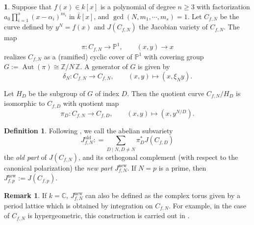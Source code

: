 \documentclass{amsart}[11pt]
\theoremstyle{definition}
\newtheorem{defn}[thm]{Definition}
\newtheorem{rem}[thm]{Remark}
\newtheorem{sect}[thm]{}
\numberwithin{equation}{section}
\theoremstyle{notitle}
\begin{document}
\begin{sect}
  

  Suppose that $f(x)\in k[x]$ is a polynomial of degree $n\geq 3$ with
  factorization $a_0\prod_{i=1}^s(x-\alpha_i)^{m_i}$ in $\bar{k}[x]$,
  and $\gcd(N, m_1, \cdots, m_s)=1$. Let $C_{f,N}$ be the curve
  defined by $y^N=f(x)$ and $J(C_{f,N})$ the Jacobian variety of
  $C_{f,N}$. The map
\begin{equation}
  \label{eq:cyclic_cover}
  \pi : C_{f,N}\to {\mathbb{P}}^1,\qquad (x,y)\to x
\end{equation}
realizes $C_{f,N}$ as a (ramified) cyclic cover of ${\mathbb{P}}^1$ with
covering group $G:=\operatorname{Aut}(\pi)\cong {\mathbb{Z}/ {N}\, \mathbb{Z}}$. A generator of
$G$ is given by
\[ \delta_N: C_{f,N}\to C_{f, N}, \qquad (x,y)\mapsto (x, \xi_N
y).\] 

Let $H_D$ be the subgroup of $G$ of index $D$. Then the quotient curve
$C_{f,N}/H_D$ is isomorphic to $C_{f, D}$ with quotient map
\begin{equation}
  \label{eq:quotient}
 \pi_D: C_{f,N}\to C_{f, D}, \qquad (x,y)\mapsto (x, y^{N/D}).  
\end{equation}
\end{sect}

\begin{defn}\label{defn:def-of-new-part}
Following \cite[Definition 5.1]{MR1708603}, we call the abelian
subvariety 
\[ J_{f,N}^{\mathrm{old}}: = \sum_{D\mid N, D\neq N} \pi_D^* J(C_{f,D}) \] the
\textit{old part} of $J(C_{f,N})$, and its orthogonal complement (with
respect to the canonical polarization) the \textit{new part}
$J_{f,N}^{\mathrm{new}}$.  If $N=p$ is a prime, then $J_{f,p}^{\mathrm{new}}:=J(C_{f,p})$. 
\end{defn}
\begin{rem}
  If $k={\mathbb{C}}$, $J_{f,N}^{\mathrm{new}}$ can also be defined as the complex torus
  given by a period lattice which is obtained by integration on
  $C_{f,N}$. For example, in the case of $C_{f,N}$ is hypergeometric,
  this construction is carried out in \cite[Section 3]{MR1075639}. 
\end{rem}
\end{document}
